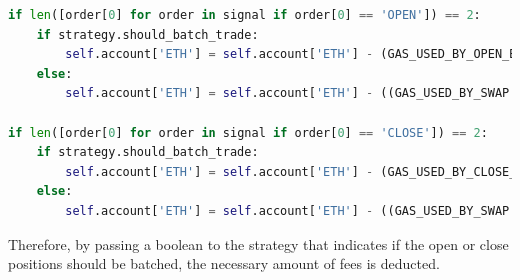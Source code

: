 \vspace{5mm}
\begin{lstlisting}[language=Python]
if len([order[0] for order in signal if order[0] == 'OPEN']) == 2:
    if strategy.should_batch_trade:
        self.account['ETH'] = self.account['ETH'] - (GAS_USED_BY_OPEN_BUY_AND_SELL_POSITION * gas_price_in_eth)
    else:
        self.account['ETH'] = self.account['ETH'] - ((GAS_USED_BY_SWAP + GAS_USED_BY_SWAP + GAS_USED_BY_BORROW) * gas_price_in_eth)

if len([order[0] for order in signal if order[0] == 'CLOSE']) == 2:
    if strategy.should_batch_trade:
        self.account['ETH'] = self.account['ETH'] - (GAS_USED_BY_CLOSE_BUY_AND_SELL_POSITION * gas_price_in_eth)
    else:
        self.account['ETH'] = self.account['ETH'] - ((GAS_USED_BY_SWAP + GAS_USED_BY_SWAP + GAS_USED_BY_REPAY) * gas_price_in_eth)

\end{lstlisting}
\vspace{5mm}
Therefore, by passing a boolean to the strategy that indicates if the open or close positions should be batched, the necessary amount of fees is deducted.

